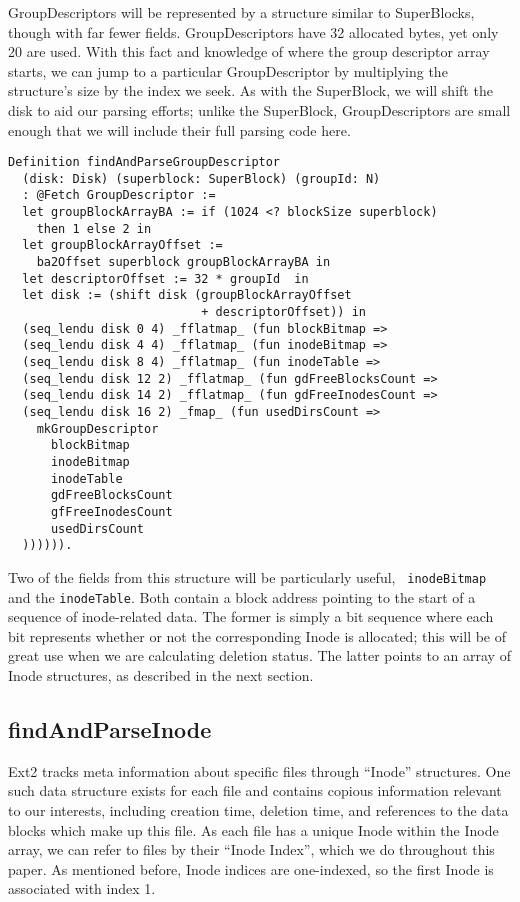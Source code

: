 \documentclass[nocopyrightspace]{sigplanconf}
\begin{document}
GroupDescriptors will be represented by a structure similar to SuperBlocks,
though with far fewer fields. GroupDescriptors have 32 allocated bytes, yet
only 20 are used. With this fact and knowledge of where the group descriptor
array starts, we can jump to a particular GroupDescriptor by multiplying the
structure's size by the index we seek. As with the SuperBlock, we will shift
the disk to aid our parsing efforts; unlike the SuperBlock, GroupDescriptors
are small enough that we will include their full parsing code here.

\begin{lstlisting}
Definition findAndParseGroupDescriptor 
  (disk: Disk) (superblock: SuperBlock) (groupId: N)
  : @Fetch GroupDescriptor :=
  let groupBlockArrayBA := if (1024 <? blockSize superblock)
    then 1 else 2 in
  let groupBlockArrayOffset := 
    ba2Offset superblock groupBlockArrayBA in
  let descriptorOffset := 32 * groupId  in
  let disk := (shift disk (groupBlockArrayOffset 
                           + descriptorOffset)) in
  (seq_lendu disk 0 4) _fflatmap_ (fun blockBitmap =>
  (seq_lendu disk 4 4) _fflatmap_ (fun inodeBitmap =>
  (seq_lendu disk 8 4) _fflatmap_ (fun inodeTable =>
  (seq_lendu disk 12 2) _fflatmap_ (fun gdFreeBlocksCount =>
  (seq_lendu disk 14 2) _fflatmap_ (fun gdFreeInodesCount =>
  (seq_lendu disk 16 2) _fmap_ (fun usedDirsCount =>
    mkGroupDescriptor
      blockBitmap
      inodeBitmap
      inodeTable
      gdFreeBlocksCount
      gfFreeInodesCount
      usedDirsCount
  )))))).
\end{lstlisting}

Two of the fields from this structure will be particularly useful, {\tt
inodeBitmap} and the {\tt inodeTable}. Both contain a block address pointing
to the start of a sequence of inode-related data. The former is simply a bit
sequence where each bit represents whether or not the corresponding Inode is
allocated; this will be of great use when we are calculating deletion status.
The latter points to an array of Inode structures, as described in the next
section.

\subsection{findAndParseInode}

Ext2 tracks meta information about specific files through ``Inode''
structures. One such data structure exists for each file and contains copious
information relevant to our interests, including creation time, deletion time,
and references to the data blocks which make up this file. As each file has a
unique Inode within the Inode array, we can refer to files by their ``Inode
Index'', which we do throughout this paper. As mentioned before, Inode indices
are one-indexed, so the first Inode is associated with index 1.
\end{document}
